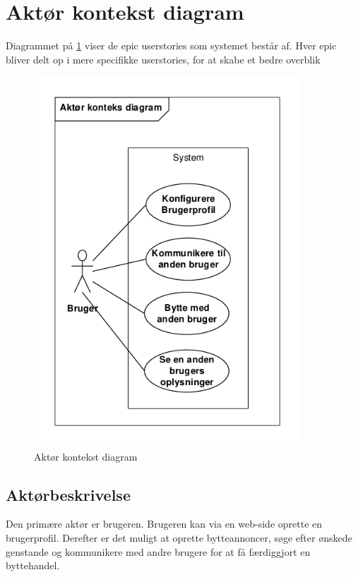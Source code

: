 \section{Aktør kontekst diagram}
Diagrammet på \ref{fig:KontekstDia} viser de epic userstories som systemet består af. Hver epic bliver delt op i mere specifikke userstories, for at skabe et bedre overblik

\begin{figure}[H]
	\includegraphics[trim = 6mm 6mm 6mm 6mm, clip, width=100mm]{figures/KontekstDiagram.PDF}
	\caption{Aktør kontekst diagram}
	\label{fig:KontekstDia}
\end{figure}

\subsection{Aktørbeskrivelse}
Den primære aktør er brugeren. Brugeren kan via en web-side oprette en brugerprofil. Derefter er det muligt at oprette bytteannoncer, søge efter ønskede genstande og kommunikere med andre brugere for at få færdiggjort en byttehandel.